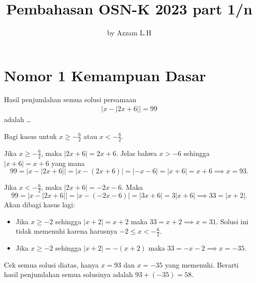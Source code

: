 \documentclass[12pt]{scrartcl}
\title{Pembahasan OSN-K 2023 part 1/n}
\author{by Azzam L.H}
\date{}
\begin{document}
\maketitle
\pagestyle{plain}
\vspace{-1.5cm}


\section{Nomor 1 Kemampuan Dasar}
Hasil penjumlahan semua solusi persamaan
\begin{align*}
|x-|2x+6||=99
\end{align*}
adalah \dots
\begin{solusi}
Bagi kasus untuk $x \ge -\tfrac{6}{2}$ atau $x < -\tfrac{6}{2}$.

Jika $x \ge -\tfrac{6}{2}$, maka $|2x+6| = 2x+6$. Jelas bahwa $x > -6$ sehingga $|x+6|=x+6$ yang mana
$$99=|x-|2x+6||=|x-(2x+6)|=|-x-6|=|x+6|=x+6 \implies x = 93.$$

Jika $x < -\tfrac{6}{2}$, maka $|2x+6| = -2x-6$. Maka
$$99=|x-|2x+6||=|x-(-2x-6)|=|3x+6|=3|x+6| \implies 33=|x+2|.$$
Akan dibagi kasus lagi:
\begin{itemize}
\item Jika $x \ge -2$ sehingga $|x+2|=x+2$ maka $33=x+2 \implies x=31$. Solusi ini tidak memenuhi karena harusnya $-2 \le x < -\tfrac{6}{2}$.
\item Jika $x \ge -2$ sehingga $|x+2|=-(x+2)$ maka $33=-x-2 \implies x=-35$.
\end{itemize}
Cek semua solusi diatas, hanya $x=93$ dan $x=-35$ yang memenuhi. Berarti hasil penjumlahan semua solusinya adalah $93+(-35)=\boxed{58}$.

\end{solusi}
\end{document}
